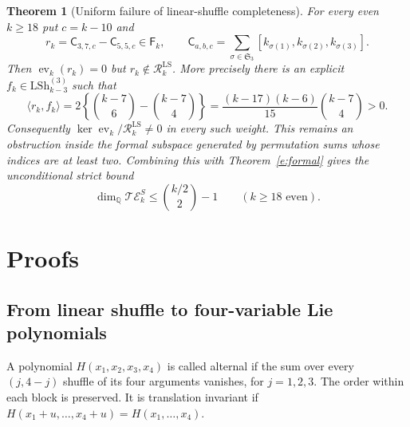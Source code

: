 \documentclass[12pt]{amsart}
\newtheorem{thm}{Theorem}[section]
\theoremstyle{definition}
\theoremstyle{remark}
\numberwithin{equation}{section}
\newcommand{\Q}{\mathbb{Q}}
\newcommand{\LS}{\mathrm{LSh}}
\newcommand{\ev}{\operatorname{ev}}
\newcommand{\RR}{\mathcal R^{\mathrm{LS}}}
\newcommand{\FF}{\mathsf F}
\newcommand{\fC}[3]{\mathsf C_{#1,#2,#3}}
\numberwithin{equation}{section}
\begin{document}
\begin{thm}[Uniform failure of linear-shuffle completeness]\label{e:negative}
For every even $k\ge18$ put $c=k-10$ and
\[
 r_k=\fC{3}{7}{c}-\fC{5}{5}{c}\in\FF_k,\qquad
 \fC{a}{b}{c}=\sum_{\sigma\in\mathfrak S_3}
 [k_{\sigma(1)},k_{\sigma(2)},k_{\sigma(3)}].
\]
Then $\ev_k(r_k)=0$ but $r_k\notin\RR_k$. More precisely there is an
explicit $f_k\in\LS_{k-3}^{(3)}$ such that
\begin{equation}\label{e:certificate}
 \langle r_k,f_k\rangle
 =2\left\{\binom{k-7}{6}-\binom{k-7}{4}\right\}
 =\frac{(k-17)(k-6)}{15}\binom{k-7}{4}>0.
\end{equation}
Consequently $\ker\ev_k/\RR_k\ne0$ in every such weight. This remains
an obstruction inside the formal subspace generated by permutation sums
whose indices are at least two.
Combining this with Theorem~\ref{e:formal} gives the unconditional strict bound
\[
 \dim_{\Q}\mathcal{TE}_k^S\le\binom{k/2}{2}-1\qquad(k\ge18\text{ even}).
\]
\end{thm}

\section{Proofs}
\subsection{From linear shuffle to four-variable Lie polynomials}
A polynomial $H(x_1,x_2,x_3,x_4)$ is called alternal if the sum over every
$(j,4-j)$ shuffle of its four arguments vanishes, for $j=1,2,3$.
The order within each block is preserved. It is translation invariant if
$H(x_1+u,\ldots,x_4+u)=H(x_1,\ldots,x_4)$.
\end{document}
